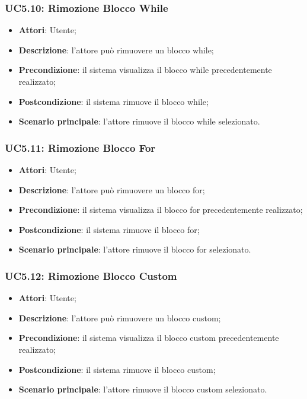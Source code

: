 \subsubsection{UC5.10: Rimozione Blocco While}
\label{UC5.10}
\begin{itemize}
\item \textbf{Attori}: Utente;
\item \textbf{Descrizione}: l'attore può rimuovere un blocco while;	
\item \textbf{Precondizione}: il sistema visualizza il blocco while precedentemente realizzato;	
\item \textbf{Postcondizione}: il sistema rimuove il blocco while;	
\item \textbf{Scenario principale}:
l'attore rimuove il blocco while selezionato.	
\end{itemize}

\subsubsection{UC5.11: Rimozione Blocco For}
\label{UC5.11}
\begin{itemize}
\item \textbf{Attori}: Utente;
\item \textbf{Descrizione}: l'attore può rimuovere un blocco for;	
\item \textbf{Precondizione}: il sistema visualizza il blocco for precedentemente realizzato;	
\item \textbf{Postcondizione}: il sistema rimuove il blocco for;	
\item \textbf{Scenario principale}:
l'attore rimuove il blocco for selezionato.	
\end{itemize}

\subsubsection{UC5.12: Rimozione Blocco Custom}
\label{UC5.12}
\begin{itemize}
\item \textbf{Attori}: Utente;
\item \textbf{Descrizione}: l'attore può rimuovere un blocco custom;	
\item \textbf{Precondizione}: il sistema visualizza il blocco custom precedentemente realizzato;	
\item \textbf{Postcondizione}: il sistema rimuove il blocco custom;	
\item \textbf{Scenario principale}:
l'attore rimuove il blocco custom selezionato.	
\end{itemize}

